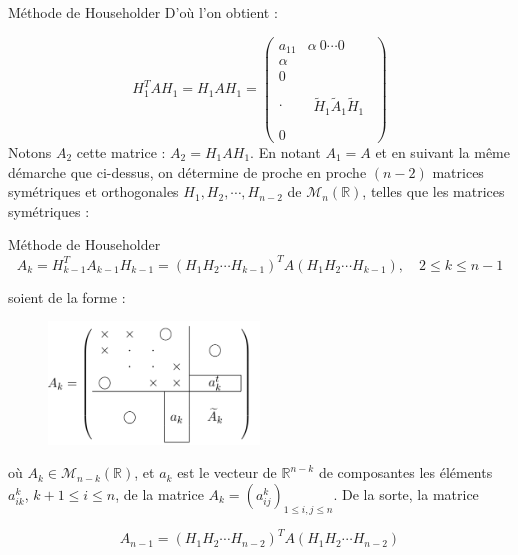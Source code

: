 \documentclass[french, 10pt]{beamer}
\theoremstyle{definition}
\begin{document}
\begin{frame}{Méthode de Householder}
	D'où l'on obtient :
	
	$$
	H_1^T A H_1=H_1 A H_1=\left(\begin{array}{c|c}
		a_{11} & \alpha\ 0 \cdots 0\\
		\hline
		\alpha \\ 0 \\ \cdot & \begin{array}{c} \quad \\ \widetilde{H}_1 \tilde{A}_1 \widetilde{H}_1 \\ \quad \end{array}  \\ 0   
	\end{array}\right)
	$$
	Notons $A_2$ cette matrice : $A_2=H_1 A H_1$. En notant $A_1=A$ et en suivant la même démarche que ci-dessus, on détermine de proche en proche $(n-2)$ matrices symétriques et orthogonales $H_1, H_2, \cdots, H_{n-2}$ de $\mathcal{M}_n(\mathbb{R})$, telles que les matrices symétriques :
	
\end{frame}
\begin{frame}{Méthode de Householder}
	$$
	A_k=H_{k-1}^T A_{k-1} H_{k-1}=\left(H_1 H_2 \cdots H_{k-1}\right)^T A\left(H_1 H_2 \cdots H_{k-1}\right), \quad 2 \leq k \leq n-1
	$$
	
	soient de la forme :
	
	\begin{figure}[h]
		\centering
		\includegraphics[width=0.5\textwidth]{pictures/one.png}  %
		\label{fig:image1}
	\end{figure}
	
	
	
	où $A_k \in \mathcal{M}_{n-k}(\mathbb{R})$, et $a_k$ est le vecteur de $\mathbb{R}^{n-k}$ de composantes les éléments $a_{i k}^k$, $k+1 \leq i \leq n$, de la matrice $A_k=\left(a_{i j}^k\right)_{1 \leq i, j \leq n}$. De la sorte, la matrice
	
	$$
	A_{n-1}=\left(H_1 H_2 \cdots H_{n-2}\right)^T A\left(H_1 H_2 \cdots H_{n-2}\right)
	$$
\end{frame}
\end{document}
